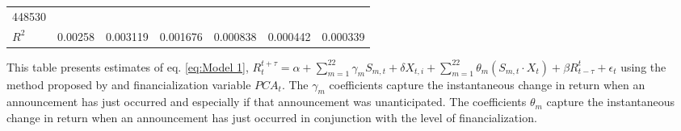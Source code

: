 \begin{sidewaystable}
{\begin{tabular}{@{}lllllllllllll@{}}
\multicolumn{2}{c}{ 448530 }                                                 \\ \textbf{$R^2$}             &\multicolumn{2}{c}{ 0.00258 }                                                 & \multicolumn{2}{c}{ 0.003119 }                                                 & \multicolumn{2}{c}{ 0.001676 }                                                 & \multicolumn{2}{c}{ 0.000838 }                                                 & \multicolumn{2}{c}{ 0.000442 }                                                   & \multicolumn{2}{c}{ 0.000339 }                                                 \\ \bottomrule 
\end{tabular}
}
\begin{tablenotes}\item 
    \singlespacing
    \footnotesize
    This table presents estimates of eq. \ref{eq:Model 1}, $R_{t}^{t+\tau}=\alpha+\sum_{m=1}^{22} \gamma_m S_{m,t}+ \delta X_{t,i} + \sum_{m=1}^{22} \theta_m (S_{m,t} \cdot X_t)+\beta R_{t-\tau}^{t}+\epsilon_{t}$ using the method proposed by \citet{kurov2019price} and financialization variable $PCA_t$. The $\gamma_m$ coefficients capture the instantaneous change in return when an announcement has just occurred and especially if that announcement was unanticipated. The coefficients $\theta_m$ capture the instantaneous change in return when an announcement has just occurred in conjunction with the level of financialization.
\end{tablenotes}
\end{sidewaystable}
